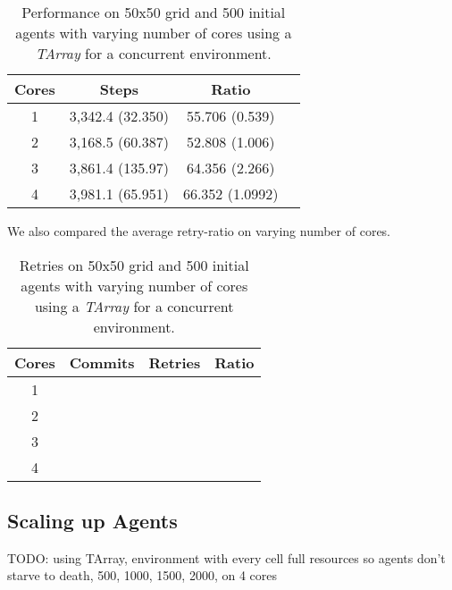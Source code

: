 \begin{table}
	\centering
  	\begin{tabular}{ c || c | c | c }
        Cores & Steps            & Ratio          \\ \hline \hline 
    	1     & 3,342.4 (32.350) & 55.706 (0.539) \\ \hline
   		2     & 3,168.5 (60.387) & 52.808 (1.006) \\ \hline
   		3     & 3,861.4 (135.97) & 64.356 (2.266) \\ \hline
   		4     & 3,981.1 (65.951) & 66.352 (1.0992) \\ \hline \hline
   	\end{tabular}
  	
  	\caption{Performance on 50x50 grid and 500 initial agents with varying number of cores using a \textit{TArray} for a concurrent environment.}
	\label{tab:tarray_results_concenv_time}
\end{table}

We also compared the average retry-ratio on varying number of cores.

\begin{table}
	\centering
  	\begin{tabular}{ c || c | c | c }
        Cores & Commits           & Retries            & Ratio \\ \hline \hline 
    	1     &                   &                    &  \\ \hline
   		2     &                   &                    &  \\ \hline
   		3     &                   &                    &  \\ \hline
   		4     &                   &                    &  \\ \hline
   	\end{tabular}
  	
  	\caption{Retries on 50x50 grid and 500 initial agents with varying number of cores using a \textit{TArray} for a concurrent environment.}
	\label{tab:tarray_naive_results_concenv_retries}
\end{table}

\subsection{Scaling up Agents}
TODO: using TArray, environment with every cell full resources so agents don't starve to death, 500, 1000, 1500, 2000, on 4 cores


